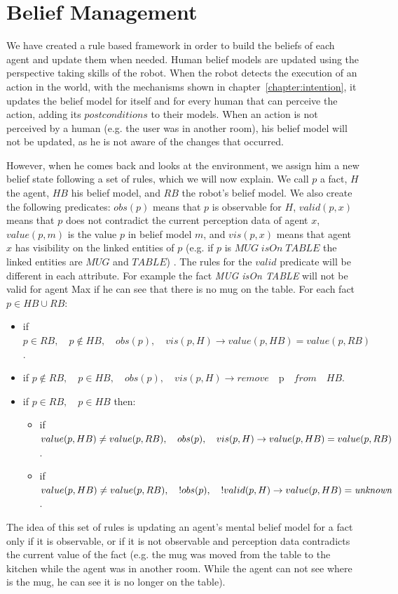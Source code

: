 \section{Belief Management}
\label{sec:belief_management-belief_management}
We have created a rule based framework in order to build the beliefs of each agent and update them when needed. Human belief models are updated using the perspective taking skills of the robot. When the robot detects the execution of an action in the world, with the mechanisms shown in chapter~\ref{chapter:intention},
it updates the belief model for itself and for every human that can perceive the action, adding its $postconditions$ to their models. When an action is not perceived by a human (e.g. the user was in another room), his belief model will not be updated, as he is not aware of the changes that occurred.

However, when he comes back and looks at the environment, we assign him a new belief state following a set of rules, which we will now explain. We call $p$ a fact, $H$ the agent, $HB$ his belief model, and $RB$ the robot's belief model. We also create the following predicates: $obs(p)$ means that $p$ is observable for $H$, $valid(p,x)$ means that $p$ does not contradict the current perception data of agent $x$, $value(p,m)$ is the value $p$ in belief model $m$, and $vis(p,x)$ means that agent $x$ has visibility on the linked entities of $p$ (e.g. if $p$ is $MUG\; isOn \; TABLE$ the linked entities are $MUG$ and $TABLE$) . The rules for the $valid$ predicate will be different in each attribute. For example the fact \textit{MUG isOn TABLE} will not be valid for agent Max if he can see that there is no mug on the table. For each fact $p\in HB \cup RB$:
\begin{itemize}
\item if $p \in RB, \quad p\not\in HB,\quad obs(p),\quad vis(p,H) \rightarrow value(p,HB)=value(p,RB)$.
\item if $p \not \in RB,\quad p\in HB,\quad obs(p),\quad vis(p,H) \rightarrow remove\quad $p$ \quad from \quad HB$.
\item if $p\in RB,\quad p\in HB$ then:
	\begin{itemize}
      \item if $value(p,HB)\neq value(p,RB),\\ \quad obs(p),\quad vis(p,H) \rightarrow \\ value(p,HB)=value(p,RB)$.
      \item if $value(p,HB)\neq value(p,RB),\\ \quad !obs(p),\quad !valid(p,H) \rightarrow \\ value(p,HB)=\textit{unknown}$.
	\end{itemize}
\end{itemize}
The idea of this set of rules is updating an agent's mental belief model for a fact only if it is observable, or if it is not observable and perception data contradicts the current value of the fact (e.g. the mug was moved from the table to the kitchen while the agent was in another room. While the agent can not see where is the mug, he can see it is no longer on the table).



